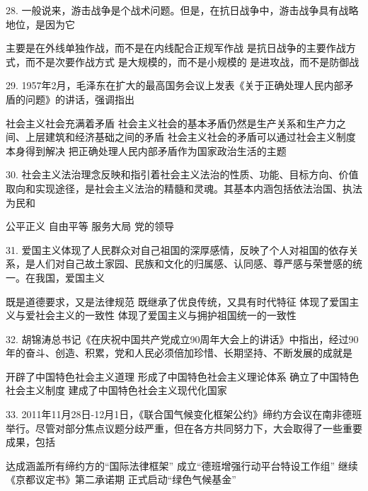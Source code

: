 28. 一般说来，游击战争是个战术问题。但是，在抗日战争中，游击战争具有战略地位，是因为它
\begin{choices}
	 主要是在外线单独作战，而不是在内线配合正规军作战
	 是抗日战争的主要作战方式，而不是次要作战方式
	 是大规模的，而不是小规模的
	 是进攻战，而不是防御战
\end{choices}

29. 1957年2月，毛泽东在扩大的最高国务会议上发表《关于正确处理人民内部矛盾的问题》的讲话，强调指出
\begin{choices}
	 社会主义社会充满着矛盾
	 社会主义社会的基本矛盾仍然是生产关系和生产力之间、上层建筑和经济基础之间的矛盾
	 社会主义社会的矛盾可以通过社会主义制度本身得到解决
	 把正确处理人民内部矛盾作为国家政治生活的主题
\end{choices}

30. 社会主义法治理念反映和指引着社会主义法治的性质、功能、目标方向、价值取向和实现途径，是社会主义法治的精髓和灵魂。其基本内涵包括依法治国、执法为民和
\begin{choices}
	 公平正义
	 自由平等
	 服务大局
	 党的领导
\end{choices}

31. 爱国主义体现了人民群众对自己祖国的深厚感情，反映了个人对祖国的依存关系，是人们对自己故土家园、民族和文化的归属感、认同感、尊严感与荣誉感的统一。在我国，爱国主义
\begin{choices}
	 既是道德要求，又是法律规范
	 既继承了优良传统，又具有时代特征
	 体现了爱国主义与爱社会主义的一致性
	 体现了爱国主义与拥护祖国统一的一致性
\end{choices}

32. 胡锦涛总书记《在庆祝中国共产党成立90周年大会上的讲话》中指出，经过90年的奋斗、创造、积累，党和人民必须倍加珍惜、长期坚持、不断发展的成就是
\begin{choices}
	 开辟了中国特色社会主义道理
	 形成了中国特色社会主义理论体系
	 确立了中国特色社会主义制度
	 建成了中国特色社会主义现代化国家
\end{choices}

33. 2011年11月28日-12月1日，《联合国气候变化框架公约》缔约方会议在南非德班举行。尽管对部分焦点议题分歧严重，但在各方共同努力下，大会取得了一些重要成果，包括
\begin{choices}
	 达成涵盖所有缔约方的“国际法律框架”
	 成立“德班增强行动平台特设工作组”
	 继续《京都议定书》第二承诺期
	 正式启动“绿色气候基金”
\end{choices}
